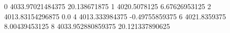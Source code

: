 0 4033.97021484375 20.138671875
1 4020.5078125 6.67626953125
2 4013.83154296875 0.0
4 4013.333984375 -0.49755859375
6 4021.8359375 8.00439453125
8 4033.952880859375 20.121337890625
